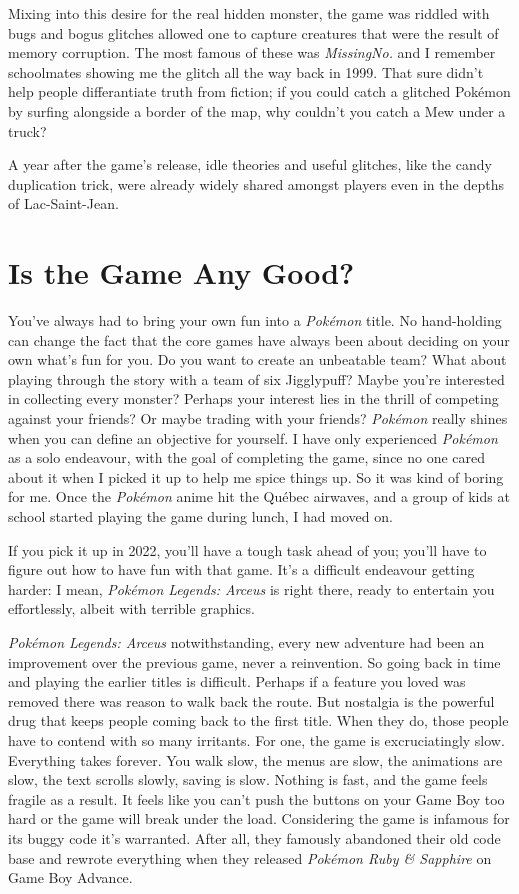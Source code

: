 \documentclass{book}
\begin{document}
Mixing into this desire for the real hidden monster, the game was riddled with bugs and bogus glitches allowed one to capture creatures that were the result of memory corruption. The most famous of these was \emph{MissingNo.} and I remember schoolmates showing me the glitch all the way back in 1999. That sure didn’t help people differantiate truth from fiction; if you could catch a glitched Pokémon by surfing alongside a border of the map, why couldn’t you catch a Mew under a truck?

A year after the game’s release, idle theories and useful glitches, like the candy duplication trick, were already widely shared amongst players even in the depths of Lac-Saint-Jean.

\FloatBarrier\needspace{5pt}\section*{Is the Game Any Good?}\nopagebreak[4]

You’ve always had to bring your own fun into a \emph{Pokémon} title. No hand-holding can change the fact that the core games have always been about deciding on your own what’s fun for you. Do you want to create an unbeatable team? What about playing through the story with a team of six Jigglypuff? Maybe you’re interested in collecting every monster? Perhaps your interest lies in the thrill of competing against your friends? Or maybe trading with your friends? \emph{Pokémon} really shines when you can define an objective for yourself. I have only experienced \emph{Pokémon} as a solo endeavour, with the goal of completing the game, since no one cared about it when I picked it up to help me spice things up. So it was kind of boring for me. Once the \emph{Pokémon} anime hit the Québec airwaves, and a group of kids at school started playing the game during lunch, I had moved on.

If you pick it up in 2022, you’ll have a tough task ahead of you; you’ll have to figure out how to have fun with that game. It’s a difficult endeavour getting harder: I mean, \emph{Pokémon Legends: Arceus} is right there, ready to entertain you effortlessly, albeit with terrible graphics.

\emph{Pokémon Legends: Arceus} notwithstanding, every new adventure had been an improvement over the previous game, never a reinvention. So going back in time and playing the earlier titles is difficult. Perhaps if a feature you loved was removed there was reason to walk back the route. But nostalgia is the powerful drug that keeps people coming back to the first title. When they do, those people have to contend with so many irritants. For one, the game is excruciatingly slow. Everything takes forever. You walk slow, the menus are slow, the animations are slow, the text scrolls slowly, saving is slow. Nothing is fast, and the game feels fragile as a result. It feels like you can’t push the buttons on your Game Boy too hard or the game will break under the load. Considering the game is infamous for its buggy code it’s warranted. After all, they famously abandoned their old code base and rewrote everything when they released \emph{Pokémon Ruby \& Sapphire} on Game Boy Advance.
\end{document}
